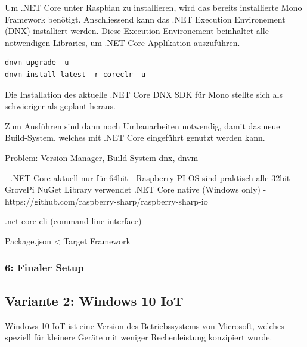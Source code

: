 Um .NET Core unter Raspbian zu installieren, wird das bereits installierte Mono Framework benötigt. Anschliessend kann das .NET Execution Environement (DNX) installiert werden. Diese Execution Environement beinhaltet alle notwendigen Libraries, um .NET Core Applikation auszuführen.

\begin{lstlisting}
dnvm upgrade -u
dnvm install latest -r coreclr -u
\end{lstlisting}

Die Installation des aktuelle .NET Core DNX SDK für Mono stellte sich als schwieriger als geplant heraus. 

Zum Ausführen sind dann noch Umbauarbeiten notwendig, damit das neue Build-System, welches mit .NET Core eingeführt genutzt werden kann.



Problem: Version Manager, Build-System
dnx, dnvm

  
    - .NET Core aktuell nur für 64bit
    - Raspberry PI OS sind praktisch alle 32bit
    - GrovePi NuGet Library verwendet .NET Core native (Windows only)
    - https://github.com/raspberry-sharp/raspberry-sharp-io
    
    .net core cli (command line interface) 
    
    Package.json < Target Framework
\subsubsection{6: Finaler Setup}



\subsection{Variante 2: Windows 10 IoT}
Windows 10 IoT ist eine Version des Betriebssystems von Microsoft, welches speziell für kleinere Geräte mit weniger Rechenleistung konzipiert wurde.

